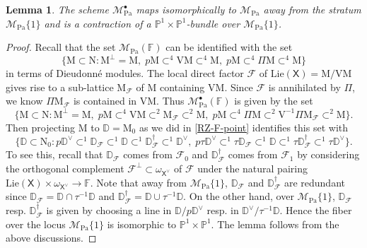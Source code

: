 \documentclass[10pt]{amsart}
\numberwithin{equation}{section}
\newtheorem{lemma}[equation]{Lemma}
\theoremstyle{definition}
\def\Pa{\mathrm{Pa}}
\def\calF{\mathcal{F}}
\def\calM{\mathcal{M}}
\def\DD{\mathbb{D}}
\def\FF{\mathbb{F}}
\def\PP{\mathbb{P}}
\def\rmM{\mathrm{M}}
\def\rmN{\mathrm{N}}
\def\rmV{\mathrm{V}}
\begin{document}
\begin{lemma}\label{bl-ss}
The scheme $\mathcal{M}^{\bullet}_{\mathrm{Pa}}$ maps isomorphically to $\mathcal{M}_{\mathrm{Pa}}$ away from the stratum $\mathcal{M}_{\Pa}\{1\}$ and is a contraction of a $\PP^{1}\times\PP^{1}$-bundle over $\mathcal{M}_{\Pa}\{1\}$.
\end{lemma}
\begin{proof}
Recall that the set $\calM_{\Pa}(\FF)$ can be identified with the set  
\begin{equation*}
\{\rmM\subset \rmN: \rmM^{\perp}=\rmM,\phantom{.}p\rmM\subset^{4} \rmV\rmM\subset^{4} \rmM,\phantom{.}p\rmM\subset^{4} \Pi \rmM\subset^{4} \rmM\}
\end{equation*}
in terms of Dieudonn\'e modules. The local direct factor $\calF$ of $\mathrm{Lie}(\mathsf{X})=\rmM/\rmV\rmM$ gives rise to a sub-lattice $\mathrm{M}_{\calF}$ of $\rmM$ containing $\rmV\rmM$. Since $\calF$ is annihilated by $\Pi$, we know $\Pi\mathrm{M}_{\calF}$ is contained in $\rmV\rmM$. Thus $\calM^{\bullet}_{\Pa}(\FF)$ is given by the set
\begin{equation*}
\{\rmM\subset \rmN: \rmM^{\perp}=\rmM,\phantom{.}p\rmM\subset^{4} \rmV\rmM\subset^{2}\mathrm{M}_{\calF}\subset^{2} \rmM,\phantom{.}p\rmM\subset^{4} \Pi \rmM\subset^{2}\rmV^{-1}\Pi\mathrm{M}_{\calF}\subset^{2} \rmM\}.
\end{equation*}
Then projecting $\rmM$ to $\DD=\rmM_{0}$ as we did in \ref{RZ-F-point} identifies this set with 
\begin{equation*}
\{\DD \subset \rmN_{0}:p\DD^{\vee} \subset^{1}\DD_{\calF} \subset^{1} \DD\subset^{1}\DD^{\dagger}_{\calF}\subset^{1} \DD^{\vee},\phantom{.}p\tau\DD^{\vee}\subset^{1}\tau\DD_{\calF} \subset^{1}  \DD\subset^{1}\tau\DD^{\dagger}_{\calF} \subset^{1} \tau\DD^{\vee}\}.
\end{equation*}
To see this, recall that $\DD_{\calF}$ comes from $\calF_{0}$ and $\DD^{\dagger}_{\calF}$ comes from $\calF_{1}$ by considering the  orthogonal complement $\calF^{\perp}\subset \omega_{\mathsf{X}^{\vee}}$ of $\calF$ under the natural pairing 
$\mathrm{Lie}(\mathsf{X})\times \omega_{\mathsf{X}^{\vee}} \rightarrow \FF$. Note that away from $\mathcal{M}_{\Pa}\{1\}$, $\DD_{\calF}$ and $\DD^{\dagger}_{\calF}$ are redundant since $\DD_{\calF}=\DD\cap\tau^{-1}\DD$ and $\DD^{\dagger}_{\calF}=\DD\cup \tau^{-1}\DD $. On the other hand, over $\mathcal{M}_{\Pa}\{1\}$, $\DD_{\calF}$ resp. $\DD^{\dagger}_{\calF}$ is given by choosing a line in $\DD/p\DD^{\vee}$ resp. in $\DD^{\vee}/\tau^{-1}\DD$. Hence the fiber over the locus $\calM_{\Pa}\{1\}$ is isomorphic to $\PP^{1}\times\PP^{1}$. The lemma follows from the above discussions.
\end{proof}
\end{document}
